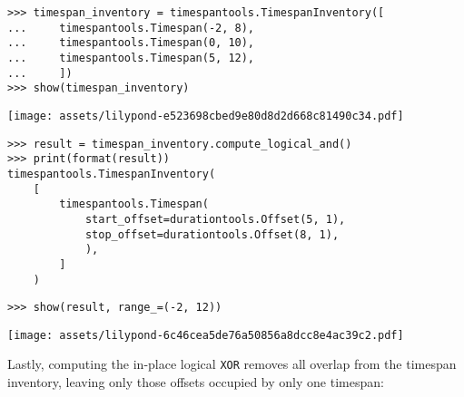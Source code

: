 \begin{singlespacing}
\vspace{-0.5\baselineskip}
\begin{lstlisting}
>>> timespan_inventory = timespantools.TimespanInventory([
...     timespantools.Timespan(-2, 8),
...     timespantools.Timespan(0, 10),
...     timespantools.Timespan(5, 12),
...     ])
>>> show(timespan_inventory)
\end{lstlisting}
\noindent\texttt{[image: assets/lilypond-e523698cbed9e80d8d2d668c81490c34.pdf]}
\begin{lstlisting}
>>> result = timespan_inventory.compute_logical_and()
>>> print(format(result))
timespantools.TimespanInventory(
    [
        timespantools.Timespan(
            start_offset=durationtools.Offset(5, 1),
            stop_offset=durationtools.Offset(8, 1),
            ),
        ]
    )
\end{lstlisting}
\begin{lstlisting}
>>> show(result, range_=(-2, 12))
\end{lstlisting}
\noindent\texttt{[image: assets/lilypond-6c46cea5de76a50856a8dcc8e4ac39c2.pdf]}
\end{singlespacing}

\noindent Lastly, computing the in-place logical \texttt{XOR} removes all
overlap from the timespan inventory, leaving only those offsets occupied by
only one timespan:

\begin{comment}
<abjad>
timespan_inventory = timespantools.TimespanInventory([
    timespantools.Timespan(-2, 2),
    timespantools.Timespan(0, 10),
    timespantools.Timespan(5, 12),
    ])
show(timespan_inventory)
result = timespan_inventory.compute_logical_xor()
print(format(result))
show(result, range_=(-2, 12))
</abjad>
\end{comment}

